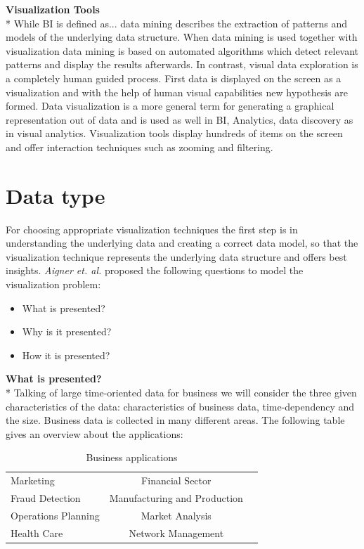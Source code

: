 \textbf{Visualization Tools}\\*
While BI is defined as... data mining describes the extraction of patterns and models of the underlying data structure\cite{FerreiradeOliveira2003}. When data mining is used together with visualization data mining is based on automated algorithms which detect relevant patterns and display the results afterwards. In contrast, visual data exploration is a completely human guided process\cite{FerreiradeOliveira2003}. First data is displayed on the screen as a visualization and with the help of human visual capabilities new hypothesis are formed. Data visualization is a more general term for generating a graphical representation out of data and is used as well in BI, Analytics, data discovery as in visual analytics. 
Visualization tools display hundreds of items on the screen and offer interaction techniques such as zooming and filtering\cite{Shneiderman2008}.


\section{Data type}
For choosing appropriate visualization techniques the first step is in understanding the underlying data and creating a correct data model\cite{Aigner2011}, so that the visualization technique represents the underlying data structure and offers best insights\cite{Bacic}. \textit{Aigner et. al.} proposed  the following questions to model the visualization problem: 
\begin{itemize}
    \item What is presented?
    \item Why is it presented?
    \item How it is presented?
\end{itemize}
\textbf{What is presented?}\\*
Talking of large time-oriented data for business we will consider the three given characteristics of the data: characteristics of business data, time-dependency and the size. Business data is collected in many different areas. The following table gives an overview about the applications: 

\begin{table}[th]
	\centering
	\caption[Table 1]{Business applications\cite{Brachman1996,Tegarden1999}}
	\label{businessapplications}
	\begin{tabu}{lcc}
	\toprule
	Marketing & Financial Sector \\
	Fraud Detection & Manufacturing and Production \\
	Operations Planning & Market Analysis \\
	Health Care & Network Management\\
	\bottomrule
	\end{tabu}
\end{table}

